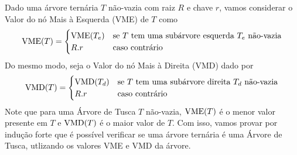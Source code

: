Dado uma árvore ternária $T$ não-vazia com raiz $R$ e chave $r$, vamos considerar o Valor do nó Mais à Esquerda (VME) de $T$ como
\[
    \operatorname{VME}(T) = \begin{cases}
        \operatorname{VME}(T_e) & \text{se $T$ tem uma subárvore esquerda $T_e$ não-vazia} \\
        R.r & \text{caso contrário}
    \end{cases}
\]
Do mesmo modo, seja o Valor do nó Mais à Direita (VMD) dado por
\[
    \operatorname{VMD}(T) = \begin{cases}
        \operatorname{VMD}(T_d) & \text{se $T$ tem uma subárvore direita $T_d$ não-vazia} \\
        R.r & \text{caso contrário}
    \end{cases}
\]
Note que para uma Árvore de Tusca $T$ não-vazia, $\operatorname{VME}(T)$ é o menor valor presente em $T$ e $\operatorname{VMD}(T)$ é o maior valor de $T$. Com isso, vamos provar por indução forte que é possível verificar se uma árvore ternária é uma Árvore de Tusca, utlizando os valores VME e VMD da árvore.

\itemsep

